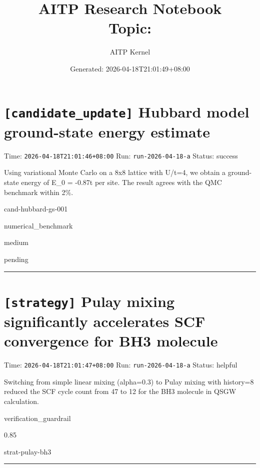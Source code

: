 \documentclass[11pt,a4paper]{article}
\title{AITP Research Notebook\\[0.5em]
\large Topic: }
\author{AITP Kernel}
\date{Generated: 2026-04-18T21:01:49+08:00}
\newcommand{\result}[1]{\textcolor{resultcolor}{#1}}
\newcommand{\warn}[1]{\textcolor{warncolor}{#1}}
\newcommand{\entrytag}[1]{\texttt{\small[#1]}}
\begin{document}
\maketitle
\tableofcontents
\newpage
\section{\entrytag{candidate\_update} Hubbard model ground-state energy estimate}

\noindent Time: \texttt{2026-04-18T21:01:46+08:00} \quad\textbar{}\quad Run: \texttt{run-2026-04-18-a} \quad\textbar{}\quad Status: \result{success}

Using variational Monte Carlo on a 8x8 lattice with U/t=4, we obtain a ground-state energy of E\_0 = -0.87t per site. The result agrees with the QMC benchmark within 2\%.

\begin{description}[leftmargin=2em]
  \item[candidate\_id] cand-hubbard-gs-001
  \item[claim\_type] numerical\_benchmark
  \item[trust\_level] medium
  \item[promotion\_status] pending
\end{description}

\hrule\vspace{0.5em}

\section{\entrytag{strategy} Pulay mixing significantly accelerates SCF convergence for BH3 molecule}

\noindent Time: \texttt{2026-04-18T21:01:47+08:00} \quad\textbar{}\quad Run: \texttt{run-2026-04-18-a} \quad\textbar{}\quad Status: \warn{helpful}

Switching from simple linear mixing (alpha=0.3) to Pulay mixing with history=8 reduced the SCF cycle count from 47 to 12 for the BH3 molecule in QSGW calculation.

\begin{description}[leftmargin=2em]
  \item[strategy\_type] verification\_guardrail
  \item[confidence] 0.85
  \item[strategy\_id] strat-pulay-bh3
\end{description}

\hrule\vspace{0.5em}
\end{document}
